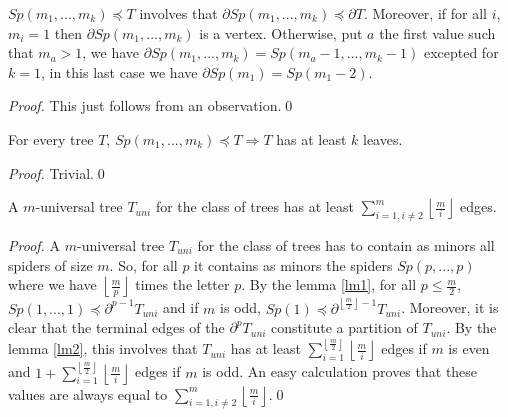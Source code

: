 \documentclass{llncs}
\begin{document}
\begin{lemma}\label{lm1} $Sp(m_1 ,...,m_k )\preceq T$ involves that $\partial Sp(m_1 ,...,m_k )\preceq \partial T$.
 Moreover, if for all $i$,
$m_i = 1$ then $\partial Sp(m_1 ,...,m_k )$ is a vertex.
Otherwise, put $a$ the first value such that $m_a > 1$, we have
$\partial Sp(m_1 ,...,m_k )= Sp(m_a - 1,...,m_k - 1)$ excepted for
$k = 1$, in this last case we have $\partial Sp(m_1 ) = Sp(m_1 -
2)$.
\end{lemma}




\begin{proof} This just follows from an observation.\qed
\end{proof}





\begin{lemma}\label{lm2} For every tree $T$, $Sp(m_1 ,...,m_k )\preceq T \Rightarrow T$ has at least $k$ leaves.
\end{lemma}

\begin{proof} Trivial.\qed
\end{proof}



\begin{theorem}\label{th3} A $m$-universal tree $T_{uni} $ for the class of trees
has at least $\sum\limits_{i = 1, i \ne 2}^m {\left\lfloor
{\frac{m}{i}} \right\rfloor } $ edges.
\end{theorem}




\begin{proof}A $m$-universal tree $T_{uni} $ for the class of trees has to contain as
minors all spiders of size $m$. So, for all $p$ it contains as
minors the spiders $Sp(p,...,p)$ where we have $\left\lfloor
{\frac{m}{p}} \right\rfloor $ times the letter $p$. By the lemma
\ref{lm1}, for all $p \leq \frac{m}{2}$, $Sp(1,...,1)\preceq
\partial ^{p - 1}T_{uni} $ and if $m$ is odd, $Sp(1)\preceq
\partial ^{\left\lfloor {\frac{m}{2}} \right\rfloor-1}T_{uni}$.
Moreover, it is clear that the terminal edges of the $\partial
^pT_{uni} $ constitute a partition of $T_{uni} $. By the lemma
\ref{lm2}, this involves that $T_{uni} $ has at least
$\sum\limits_{
 i = 1}^{\left\lfloor {\frac{m}{2}} \right\rfloor } {\left\lfloor
{\frac{m}{i}} \right\rfloor }$
 edges if $m$ is even and $1+\sum\limits_{
 i = 1}^{\left\lfloor {\frac{m}{2}} \right\rfloor} {\left\lfloor
{\frac{m}{i}} \right\rfloor}$ edges if $m$ is odd. An easy
 calculation proves that these values are always equal to $\sum\limits_{i = 1, i \ne 2}^m {\left\lfloor
{\frac{m}{i}} \right\rfloor}$.\qed
\end{proof}
\end{document}
